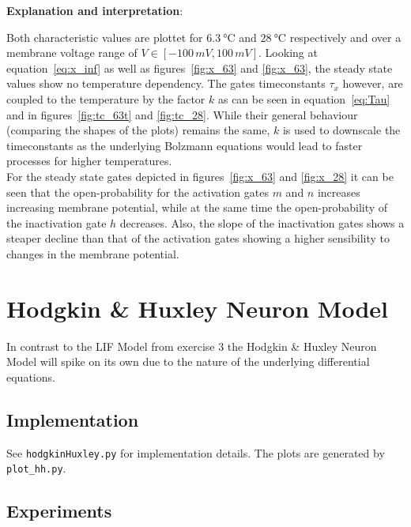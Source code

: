 \documentclass{scrartcl}			%
\begin{document}
\newpage
\begin{flushleft}
\textbf{Explanation and interpretation}:\\
\end{flushleft}
Both characteristic values are plottet for $\SI{6.3}{\celsius}$ and $\SI{28}{\celsius}$ respectively and over a membrane voltage range of $V\in[-100\,mV, 100\,mV]$.
Looking at equation~\ref{eq:x_inf} as well as figures~\ref{fig:x_63} and \ref{fig:x_63}, the steady state values show no temperature dependency. The gates timeconstants $\tau_x$ however, are coupled to the temperature by the factor $k$ as can be seen in equation~\ref{eq:Tau} and in figures~\ref{fig:tc_63t} and \ref{fig:tc_28}. While their general behaviour (comparing the shapes of the plots) remains the same, $k$ is used to downscale the timeconstants as the underlying Bolzmann equations would lead to faster processes for higher temperatures.\\
For the steady state gates depicted in figures~\ref{fig:x_63} and \ref{fig:x_28} it can be seen that the open-probability for the activation gates $m$ and $n$ increases increasing membrane potential, while at the same time the open-probability of the inactivation gate $h$ decreases. Also, the slope of the  inactivation gates shows a steaper decline than that of the activation gates showing a higher sensibility to changes in the membrane potential.

\section{Hodgkin \& Huxley Neuron Model}
In contrast to the LIF Model from exercise 3 the Hodgkin \& Huxley Neuron Model will spike on its own due to the nature of the underlying differential equations.
\subsection{Implementation}
See \texttt{hodgkinHuxley.py} for implementation details. The plots are generated by  \texttt{plot\_hh.py}.

\subsection{Experiments}
\end{document}

